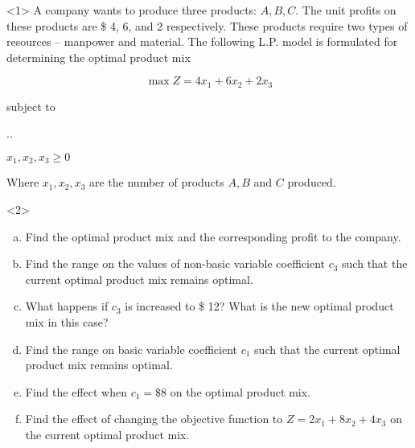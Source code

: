\begin{frameExample}{\label{example:6.6-2.1}}{}
  \begin{onlyenv}<1>
      A company wants to produce three products: $A, B, C$. The unit profits on these products are \$ 4, 6, and 2 respectively. These products require two types of resources -- manpower and material. The following L.P. model is formulated for determining the optimal product mix

  \[\max Z = 4x_1 +6x_2 +2x_3 \]

  {\centering
    subject to

    \vspace{3mm}
    \sysdelim..%

  $x_1, x_2, x_3 \geq 0$
  \par}

  Where   $x_1, x_2, x_3$ are the number of products $A, B $ and $C$ produced.
  \end{onlyenv}

\begin{onlyenv}<2>
  \begin{enumerate}[a)] \justifying \parskip3mm
  \item Find the optimal product mix and the corresponding profit to the company.
  \item Find the range on the values of non-basic variable coefficient $c_3$ such that the current optimal product mix remains optimal.
  \item What happens if $c_3$ is increased to \$ 12? What is the new optimal product mix in this case?
  \item Find the range on basic variable coefficient $c_1$ such that the current optimal product mix remains optimal.
  \item Find the effect when $c_1 = \$8$ on the optimal product mix.
  \item Find the effect of changing the objective function to $Z = 2x_1 + 8x_2 + 4x_3$ on the current optimal product mix.
  \end{enumerate}
\end{onlyenv}
\end{frameExample}



